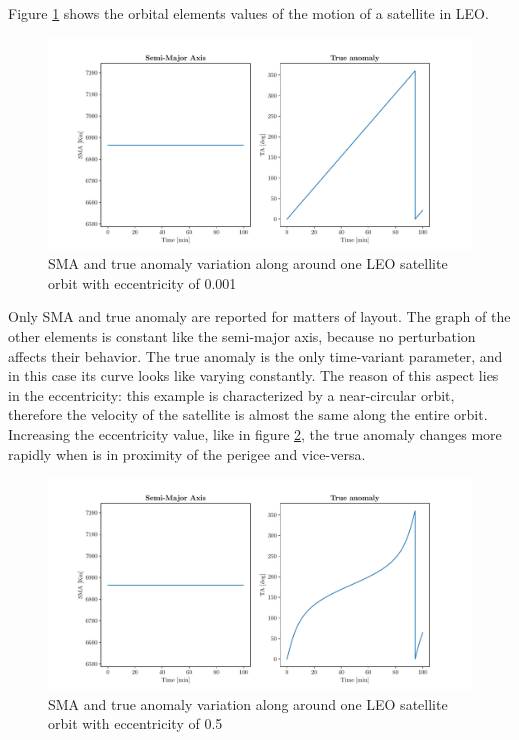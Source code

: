 Figure \ref{kep_low_ecc_fig} shows the orbital elements values of the motion of a satellite in LEO.
\begin{figure}[h]
      \centering
      \includegraphics[scale=0.5]{img/keplerian_elements_low_ecc.pdf}
      \caption{SMA and true anomaly variation along around one LEO satellite orbit with eccentricity of 0.001}
      \label{kep_low_ecc_fig}
\end{figure}
Only SMA and true anomaly are reported for matters of layout.
The graph of the other elements is constant like the semi-major axis, because no perturbation affects their behavior.
The true anomaly is the only time-variant parameter, and in this case its curve looks like varying constantly.
The reason of this aspect lies in the eccentricity: this example is characterized by a near-circular orbit, therefore the velocity of the satellite is almost the same along the entire orbit.
Increasing the eccentricity value, like in figure \ref{kep_high_ecc_fig}, the true anomaly changes more rapidly when is in proximity of the perigee and vice-versa.
\begin{figure}[h]
      \centering
      \includegraphics[scale=0.5]{img/keplerian_elements_high_ecc.pdf}
      \caption{SMA and true anomaly variation along around one LEO satellite orbit with eccentricity of 0.5}
      \label{kep_high_ecc_fig}
\end{figure}

